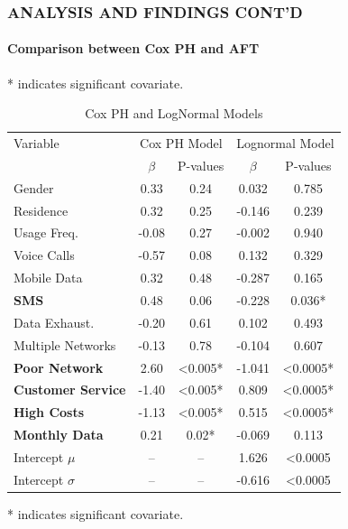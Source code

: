 \documentclass[12pt]{beamer}
\begin{document}
	\begin{frame}
    \frametitle{ANALYSIS AND FINDINGS CONT'D}
        \framesubtitle{Comparison between Cox PH and AFT}  

    \begin{table}[H]
    \centering
    \scriptsize
    \setlength{\tabcolsep}{3pt} %
        \scriptsize{* indicates significant covariate.}

    \begin{tabular}{lcc|cc}
    \toprule
    Variable & \multicolumn{2}{c}{Cox PH Model} & \multicolumn{2}{c}{Lognormal Model} \\
    \cmidrule(lr){2-3} \cmidrule(lr){4-5}
     &   \scriptsize{$\beta$}& \scriptsize{P-values}& \scriptsize{$\beta$}& \scriptsize{P-values}\\
    \midrule
    Gender & 0.33 & 0.24 & 0.032 & 0.785 \\
    Residence & 0.32 & 0.25 & -0.146 & 0.239 \\
    Usage Freq. & -0.08 & 0.27 & -0.002 & 0.940 \\
    Voice Calls & -0.57 & 0.08 & 0.132 & 0.329 \\
    Mobile Data & 0.32 & 0.48 & -0.287 & 0.165 \\
    \textbf{SMS}& 0.48 & 0.06 & -0.228 & 0.036*\\
    Data Exhaust. & -0.20 & 0.61 & 0.102 & 0.493 \\
    Multiple Networks& -0.13 & 0.78 & -0.104 & 0.607 \\
    \textbf{Poor Network}& 2.60 & <0.005* & -1.041 & <0.0005*\\
    \textbf{Customer Service}& -1.40 & <0.005* & 0.809 & <0.0005*\\
    \textbf{High Costs}& -1.13 & <0.005* & 0.515 & <0.0005*\\
    \textbf{Monthly Data}& 0.21 & 0.02* & -0.069 & 0.113 \\
    \midrule
    Intercept $\mu$ & -- & -- & 1.626 & <0.0005 \\
    Intercept $\sigma$ & -- & -- & -0.616 & <0.0005 \\
    \bottomrule
    \end{tabular}
    \scriptsize{\caption{Cox PH and LogNormal Models}}
    
    \label{tab:combined_model_results}
    \end{table}
    \scriptsize{* indicates significant covariate.}
    \end{frame}
\end{document}
